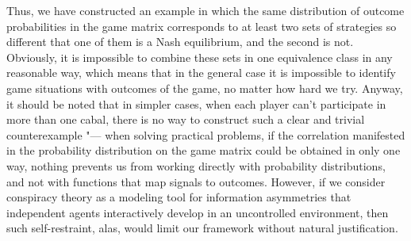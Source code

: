 Thus, we have constructed an example in which the same distribution of outcome probabilities in the game matrix corresponds to at least two sets of strategies so different that one of them is a Nash equilibrium, and the second is not. Obviously, it is impossible to combine these sets in one equivalence class in any reasonable way, which means that in the general case it is impossible to identify game situations with outcomes of the game, no matter how hard we try. Anyway, it should be noted that in simpler cases, when each player can't participate in more than one cabal, there is no way to construct such a clear and trivial counterexample "--- when solving practical problems, if the correlation manifested in the probability distribution on the game matrix could be obtained in only one way, nothing prevents us from working directly with probability distributions, and not with functions that map signals to outcomes. However, if we consider conspiracy theory as a modeling tool for information asymmetries that independent agents interactively develop in an uncontrolled environment, then such self-restraint, alas, would limit our framework without natural justification. %

\FloatBarrier
